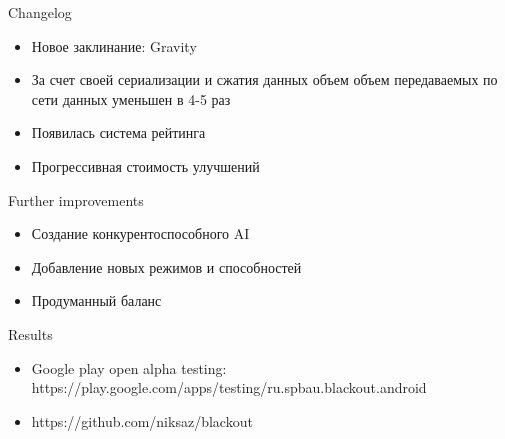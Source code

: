 \documentclass[12pt]{beamer}
\begin{document}
\begin{frame}{Changelog}
    \begin{itemize}
        \item Новое заклинание: Gravity
        \item За счет своей сериализации и сжатия данных объем объем передаваемых по сети данных уменьшен в 4-5 раз
        \item Появилась система рейтинга
        \item Прогрессивная стоимость улучшений
    \end{itemize}
\end{frame}


\begin{frame}{Further improvements}
    \begin{itemize}
        \item <1-> Создание конкурентоспособного AI
        \item <2-> Добавление новых режимов и способностей
        \item <3-> Продуманный баланс
    \end{itemize}
\end{frame}


\begin{frame}{Results}
    \begin{itemize}
        \item <1-> Google play open alpha testing: \\ https://play.google.com/apps/testing/ru.spbau.blackout.android
        \item <2-> https://github.com/niksaz/blackout
    \end{itemize}

\end{frame}
\end{document}
